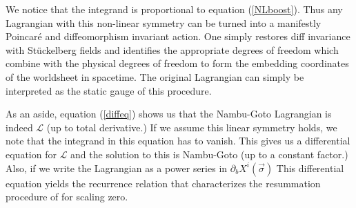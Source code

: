 \documentclass[%
 reprint,
 amsmath,amssymb,
 aps,
]{revtex4-1}
\begin{document}
We notice that the integrand is proportional to equation (\ref{NLboost}).
Thus any Lagrangian with this non-linear symmetry can be turned into a
manifestly Poincar\'{e} and diffeomorphism invariant action. One simply restores diff invariance
with St\"uckelberg fields and identifies the appropriate degrees of freedom which combine with the physical
degrees of freedom to form the embedding coordinates of the worldsheet in spacetime. The original
Lagrangian can simply be interpreted as the static gauge of this procedure.

As an aside, equation (\ref{diffeq}) shows us that the Nambu-Goto Lagrangian is indeed $\mathcal{L}$ (up to total derivative.) If we assume
this linear symmetry holds, we note that the integrand in this equation has to vanish. This gives us a differential
equation for $\mathcal{L}$ and the solution to this is Nambu-Goto (up to a constant factor.) Also, if we write the Lagrangian
as a power series in $\partial_b X^i (\vec{\sigma})$ This differential equation yields the recurrence relation that
characterizes the resummation procedure of \cite{Gliozzi:2012cx} for scaling zero.


\end{document}
